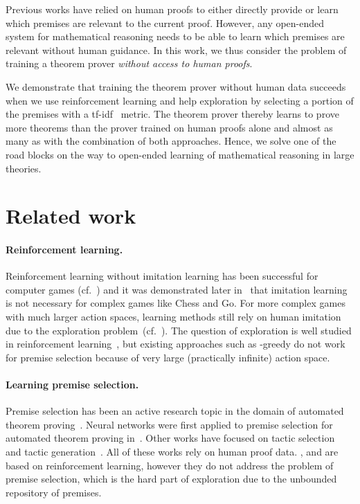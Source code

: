 \documentclass{article}
\begin{document}
Previous works have relied on human proofs to either directly provide
or learn~\citep{bansal2019holist,paliwal2020graph} which premises are relevant to the current proof.
However, any open-ended system for mathematical reasoning needs to be able to learn which premises are relevant without human guidance.
In this work, we thus consider the problem of training a theorem prover \emph{without access to human proofs}.

We demonstrate that training the theorem prover without human data succeeds when we use reinforcement learning and help exploration by selecting a portion of the premises with a \mbox{tf-idf~\citep{manning2008introduction}} metric.
The theorem prover thereby learns to prove more theorems than the prover trained on human proofs alone and almost as many as with the combination of both approaches.
Hence, we solve one of the road blocks on the way to open-ended learning of mathematical reasoning in large theories.


\section{Related work}
\label{sec:related}

\paragraph{Reinforcement learning.}
Reinforcement learning without imitation learning has been successful for computer games (cf.~\citet{mnih2013playing}) and it was demonstrated later in~\citet{silver2017masteringzero} that imitation learning is not necessary for complex games like Chess and Go.
For more complex games with much larger action spaces,
learning methods still rely on human imitation due to the exploration problem~(cf.~\citet{oriol2019alphastar}).
The question of exploration is well studied in reinforcement learning~\citep{houthooft2016vime,burda2018large}, but existing approaches such as -greedy do not work for premise selection because of very large (practically infinite) action space.


\paragraph{Learning premise selection.}
Premise selection has been an active research topic in the domain of automated theorem proving~\citep{alama2014premise,kaliszyk2015learning,blanchette2016learning,wang2017premise}. Neural networks were first applied to premise selection for automated theorem proving in~\citet{alemi2016deepmath}. Other works have focused on tactic selection~\citep{huang2018gamepad} and tactic generation~\citep{yang2019learning}.
All of these works rely on human proof data.
\cite{kaliszyk2018reinforcement}, \citet{zomboricurriculum} and \cite{zombori2020prolog} are based on reinforcement learning, however they do not address the problem of premise selection, which is the hard part of exploration due to the unbounded repository of premises.
\end{document}
